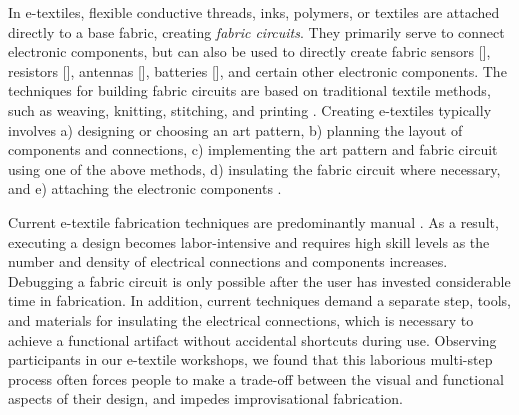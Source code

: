 \documentclass[header.tex]{subfiles}
\begin{document}
In e-textiles, flexible conductive threads, inks, polymers, or  textiles are attached directly to a base fabric, creating \textit{fabric circuits}. They primarily serve to connect electronic components, but can also be used to directly create fabric sensors [], resistors [], antennas [], batteries [], and certain other electronic components. The techniques for building fabric circuits are based on traditional textile methods, such as weaving, knitting, stitching, and printing \cite{castano2014smart}. Creating e-textiles typically involves a) designing or choosing an art pattern, b) planning the layout of components and connections, c) implementing the art pattern and fabric circuit using one of the above methods, d) insulating the fabric circuit where necessary, and e) attaching the electronic components \cite{Buechley2009}.




Current e-textile fabrication techniques are predominantly manual \cite{Kazemitabaar:2017:MTA:3025453.3025887}. As a result, executing a design becomes labor-intensive and requires high skill levels as the number and density of electrical connections and components increases. Debugging a fabric circuit is only possible after the user has invested considerable time in fabrication. In addition, current techniques demand a separate step, tools, and materials for insulating the electrical connections, which is necessary to achieve a functional artifact without accidental shortcuts during use.
Observing participants in our e-textile workshops, we found that this laborious multi-step process often forces people to make a trade-off between the visual and functional aspects of their design, and impedes improvisational fabrication. %


\end{document}
